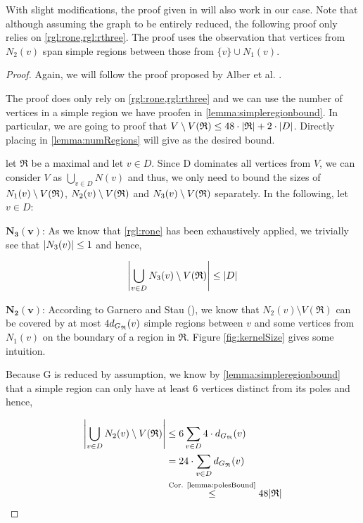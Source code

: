 With slight modifications, the proof given in \cite{Garnero2014} will also work in our case. Note that although assuming the graph to be entirely reduced, the following proof only relies on \cref*{rgl:rone,rgl:rthree}. The proof uses the observation that vertices from $N_2(v)$ span simple regions between those from $\{v\} \cup N_1(v)$.

\begin{proof}
Again, we will follow the proof proposed by Alber et al. \cite[Proposition 2]{Alber2004}. 

The proof does only rely on \cref{rgl:rone,rgl:rthree} and we can use the number of vertices in a simple region we have proofen in \cref{lemma:simpleregionbound}. In particular, we are going to proof that $V \setminus V(\mathfrak{R}) \leq 48 \cdot \abs{\mathfrak{R}} + 2 \cdot \abs{D}$. Directly placing in \cref{lemma:numRegions} will give as the desired bound.

let $\mathfrak{R}$ be a maximal \dreg and let $v \in D$. Since D dominates all vertices from $V$, we can consider $V$ as $\bigcup_{v \in D}N(v)$ and thus, we only need to bound the sizes of $N_1(v)\setminus {V(\mathfrak{R})} $, $N_2(v) \setminus {V(\mathfrak{R})} $ and $N_3(v) \setminus {V(\mathfrak{R})} $ separately. In the following, let $v \in D$:

\noindent$\mathbf{N_3(v)}$: As we know that \cref{rgl:rone} has been exhaustively applied, we trivially see that $\abs{N_3(v)} \leq 1$ and hence, 

\[\abs{\bigcup_{v \in D}N_3(v) \setminus V(\mathfrak{R})} \leq \abs{D}\]

\noindent$\mathbf{N_2(v)}$: According to Garnero and Stau (\cite[Proposition 2]{Garnero2018}), we know that $N_2(v) \setminus V(\mathfrak{R})$ can be covered by at most $4 d_{G_{\mathfrak{R}}}(v)$ simple regions between $v$ and some vertices from $N_1(v)$ on the boundary of a region in $\mathfrak{R}$. Figure \ref{fig:kernelSize} gives some intuition.

Because G is reduced by assumption, we know by \cref{lemma:simpleregionbound} that a simple region can only have at least 6 vertices distinct from its poles and hence,

\begin{equation}
    \begin{split}
        \abs{\bigcup_{v \in D} N_2(v) \setminus V(\mathfrak{R})} &\leq 6 \sum_{v \in D}4 \cdot d_{G_{\mathfrak{R}}}(v) \\
        &= 24 \cdot \sum_{v \in D}d_{G_{\mathfrak{R}}}(v) \\
        &\overset{\text{Cor. \ref{lemma:polesBound}}}{\leq} 48 \abs{\mathfrak{R}}
    \end{split}
\end{equation}



\end{proof}
